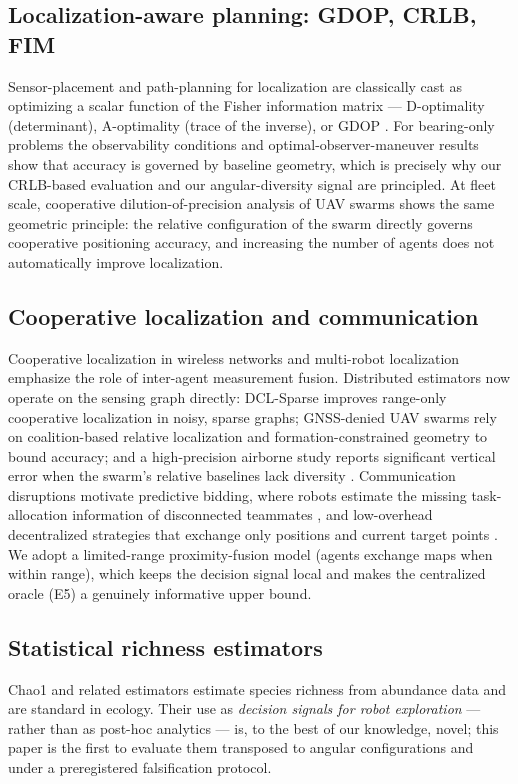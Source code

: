 \documentclass[journal]{IEEEtran}
\begin{document}
\subsection{Localization-aware planning: GDOP, CRLB, FIM}
Sensor-placement and path-planning for localization are classically cast as
optimizing a scalar function of the Fisher information matrix --- D-optimality
(determinant), A-optimality (trace of the inverse), or GDOP
\cite{Kaplan2017, Ucinski2005, Martinez2006, Krause2008}. For bearing-only
problems the observability conditions \cite{NardoneAidala1981} and
optimal-observer-maneuver results \cite{Passerieux1998, Oshman1999,
Dogancay2012} show that accuracy is governed by baseline geometry, which is
precisely why our CRLB-based evaluation \cite{Cramér1946, Rao1945} and our
angular-diversity signal are principled. At fleet scale, cooperative
dilution-of-precision analysis of UAV swarms \cite{Chen2020} shows the same
geometric principle: the relative configuration of the swarm directly governs
cooperative positioning accuracy, and increasing the number of agents does not
automatically improve localization.

\subsection{Cooperative localization and communication}
Cooperative localization in wireless networks \cite{Patwari2005,
Wymeersch2009} and multi-robot localization \cite{Ristic2004} emphasize the
role of inter-agent measurement fusion. Distributed estimators now operate on
the sensing graph directly: DCL-Sparse \cite{Sagale2024} improves range-only
cooperative localization in noisy, sparse graphs; GNSS-denied UAV swarms rely
on coalition-based relative localization \cite{Ruan2022} and
formation-constrained geometry \cite{Li2026} to bound accuracy; and a
high-precision airborne study reports significant vertical error when the
swarm's relative baselines lack diversity \cite{Liu2026}. Communication
disruptions motivate predictive bidding, where robots estimate the missing
task-allocation information of disconnected teammates \cite{Woosley2021}, and
low-overhead decentralized strategies that exchange only positions and current
target points \cite{Batinovic2020}. We adopt a limited-range proximity-fusion
model (agents exchange maps when within range), which keeps the decision signal
local and makes the centralized oracle (E5) a genuinely informative upper
bound.

\subsection{Statistical richness estimators}
Chao1 and related estimators \cite{Chao1984, ChaoLee1992, ChaoYang1993,
BurnhamOverton1978} estimate species richness from abundance data and are
standard in ecology. Their use as \emph{decision signals for robot
exploration} --- rather than as post-hoc analytics --- is, to the best of our
knowledge, novel; this paper is the first to evaluate them transposed to
angular configurations and under a preregistered falsification protocol.
\end{document}
